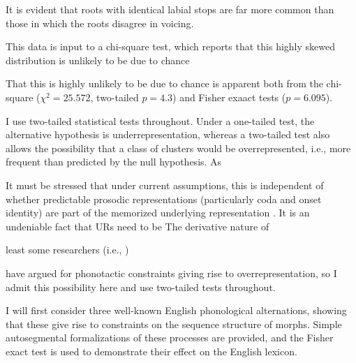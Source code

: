 \noindent
It is evident that roots with identical labial stops are far more common than those in which the roots disagree in voicing. 

This data is input to a chi-square test, which reports that this highly skewed distribution is unlikely to be due to chance 

That this is highly unlikely to be due to chance is apparent both from the chi-square ($\chi^2 = 25.572$, two-tailed $p = 4.3$) and Fisher exaact tests ($p =  6.095$). 

I use two-tailed statistical tests throughout. 
Under a one-tailed test, the alternative hypothesis is underrepresentation, whereas a two-tailed test also allows the possibility that a class of clusters would be overrepresented, i.e., more frequent than predicted by the null hypothesis. As 

\citet{Pierrehumbert1994}

It must be stressed that under current assumptions, this is independent of whether predictable prosodic representations (particularly coda and onset identity) are part of the memorized underlying representation \citep[e.g.,][]{Vaux2003}.
It is an undeniable fact that URs need to be 
The derivative nature of 
\citet{Ito1989a,Noske1992}

least some researchers (i.e., \citealt{Mester1988}) 

 \citep[e.g.,]{Brown2010} have argued for phonotactic constraints giving rise to overrepresentation, so I admit this possibility here and use two-tailed tests throughout. 





I will first consider three well-known English phonological alternations, showing that these give rise to constraints on the sequence structure of morphs. Simple autosegmental formalizations of these processes are provided, and the Fisher exact test is used to demonstrate their effect on the English lexicon.

